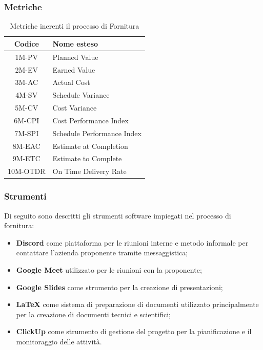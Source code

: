 \subsubsection{Metriche}
\begin{table}[!h]
	\centering
	\begin{tabular}{|c|l|}
		\hline
		\textbf{Codice} & \textbf{Nome esteso}       \\
		\hline
		1M-PV           & Planned Value              \\
		2M-EV           & Earned Value               \\
		3M-AC           & Actual Cost                \\
		4M-SV           & Schedule Variance          \\
		5M-CV           & Cost Variance              \\
		6M-CPI          & Cost Performance Index     \\
		7M-SPI          & Schedule Performance Index \\
		8M-EAC          & Estimate at Completion     \\
		9M-ETC          & Estimate to Complete       \\
		10M-OTDR        & On Time Delivery Rate      \\
		\hline
	\end{tabular}
	\caption{Metriche inerenti il processo di Fornitura}
\end{table}

\subsubsection{Strumenti}
Di seguito sono descritti gli strumenti software impiegati nel processo di fornitura:
\begin{itemize}
	\item \textbf{Discord} come piattaforma per le riunioni interne e metodo informale per contattare l'azienda proponente tramite messaggistica;
	\item \textbf{Google Meet} utilizzato per le riunioni con la proponente;
	\item \textbf{Google Slides} come strumento per la creazione di presentazioni;
	\item \textbf{LaTeX} come sistema di preparazione di documenti utilizzato principalmente per la creazione di documenti tecnici e scientifici;
	\item \textbf{ClickUp} come strumento di gestione del progetto per la pianificazione e il monitoraggio delle attività.
\end{itemize}

